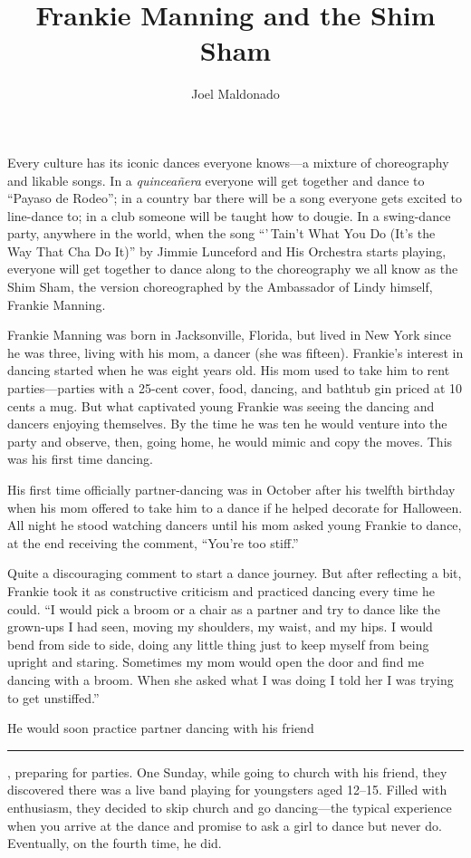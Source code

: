 \documentclass[12pt]{article}
\title{Frankie Manning and the Shim Sham}
\author{Joel Maldonado}
\date{}
\begin{document}
\doublespacing            %
\maketitle

Every culture has its iconic dances everyone knows—a mixture of choreography and likable songs. In a \emph{quinceañera} everyone will get together and dance to ``Payaso de Rodeo''; in a country bar there will be a song everyone gets excited to line-dance to; in a club someone will be taught how to dougie. In a swing-dance party, anywhere in the world, when the song ``'\,Tain't What You Do (It's the Way That Cha Do It)'' by Jimmie Lunceford and His Orchestra starts playing, everyone will get together to dance along to the choreography we all know as the Shim Sham, the version choreographed by the Ambassador of Lindy himself, Frankie Manning.

Frankie Manning was born in Jacksonville, Florida, but lived in New York since he was three, living with his mom, a dancer (she was fifteen). Frankie’s interest in dancing started when he was eight years old. His mom used to take him to rent parties—parties with a 25-cent cover, food, dancing, and bathtub gin priced at 10 cents a mug. But what captivated young Frankie was seeing the dancing and dancers enjoying themselves. By the time he was ten he would venture into the party and observe, then, going home, he would mimic and copy the moves. This was his first time dancing.

His first time officially partner-dancing was in October after his twelfth birthday when his mom offered to take him to a dance if he helped decorate for Halloween. All night he stood watching dancers until his mom asked young Frankie to dance, at the end receiving the comment, ``You’re too stiff.''

Quite a discouraging comment to start a dance journey. But after reflecting a bit, Frankie took it as constructive criticism and practiced dancing every time he could. ``I would pick a broom or a chair as a partner and try to dance like the grown-ups I had seen, moving my shoulders, my waist, and my hips. I would bend from side to side, doing any little thing just to keep myself from being upright and staring. Sometimes my mom would open the door and find me dancing with a broom. When she asked what I was doing I told her I was trying to get unstiffed.''

He would soon practice partner dancing with his friend \rule{2cm}{0.15mm}, preparing for parties. One Sunday, while going to church with his friend, they discovered there was a live band playing for youngsters aged 12–15. Filled with enthusiasm, they decided to skip church and go dancing—the typical experience when you arrive at the dance and promise to ask a girl to dance but never do. Eventually, on the fourth time, he did.
\end{document}
